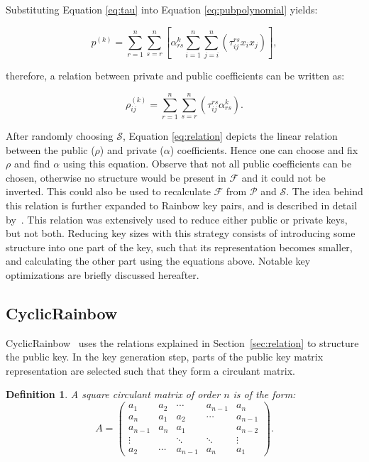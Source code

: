 \documentclass{ufsctex/ufsctex}
\newtheorem{definition}{Definition}
\begin{document}
Substituting Equation \ref{eq:tau} into Equation \ref{eq:pubpolynomial} yields:

\begin{equation}
p^{(k)} = \sum_{r=1}^n \sum_{s=r}^n
\left[
\alpha^{k}_{rs} \sum_{i=1}^{n}\sum_{j=i}^n \left( \tau^{rs}_{ij} x_i x_j \right)
\right],
\end{equation}

\noindent
therefore, a relation between private and public coefficients can be written as:

\begin{equation}\label{eq:relation}
\rho^{(k)}_{ij} = \sum_{r=1}^{n}\sum_{s=r}^n
\left( \tau^{rs}_{ij} \alpha^{k}_{rs} \right).
\end{equation}

After randomly choosing $\mathcal{S}$, Equation \ref{eq:relation} depicts the
linear relation between the public ($\rho$) and private ($\alpha$)
coefficients. Hence one can choose and fix $\rho$ and find $\alpha$ using this
equation. Observe that not all public coefficients can be chosen, otherwise no
structure would be present in $\mathcal{F}$ and it could not be inverted. This
could also be used to recalculate $\mathcal{F}$ from $\mathcal{P}$ and
$\mathcal{S}$. The idea behind this relation is further expanded to Rainbow key
pairs, and is described in detail by~\cite{petzoldt2011small}. This relation
was extensively used to reduce either public or private keys, but not both.
Reducing key sizes with this strategy consists of introducing some structure
into one part of the key, such that its representation becomes smaller, and
calculating the other part using the equations above. Notable key optimizations
are briefly discussed hereafter.

\subsection{CyclicRainbow}

CyclicRainbow~\cite{petzoldt2010cyclicrainbow} uses the relations explained in
Section~\ref{sec:relation} to structure the public key. In the key generation
step, parts of the public key matrix representation are selected such that they
form a circulant matrix.

\begin{definition}
A square circulant matrix of order $n$ is of the form:
\begin{equation}
A =
\begin{pmatrix}
a_1     & a_2    & \cdots  & a_{n-1} & a_n     \\
a_n     & a_1    & a_2     & \cdots  & a_{n-1} \\
a_{n-1} & a_n    & a_1     &         & a_{n-2} \\
\vdots  &        & \ddots  & \ddots  & \vdots  \\
a_2     & \cdots & a_{n-1} & a_n     & a_1
\end{pmatrix}.
\end{equation}
\end{definition}
\end{document}
